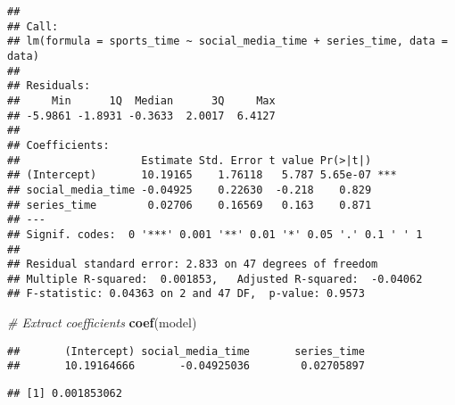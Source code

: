 \documentclass[
]{article}
\newenvironment{Shaded}{\begin{snugshade}}{\end{snugshade}}
\newcommand{\CommentTok}[1]{\textcolor[rgb]{0.56,0.35,0.01}{\textit{#1}}}
\newcommand{\FunctionTok}[1]{\textcolor[rgb]{0.13,0.29,0.53}{\textbf{#1}}}
\newcommand{\NormalTok}[1]{#1}
\newcommand{\OtherTok}[1]{\textcolor[rgb]{0.56,0.35,0.01}{#1}}
\newcommand{\SpecialCharTok}[1]{\textcolor[rgb]{0.81,0.36,0.00}{\textbf{#1}}}
\newcommand{\StringTok}[1]{\textcolor[rgb]{0.31,0.60,0.02}{#1}}
\begin{document}
\begin{verbatim}
## 
## Call:
## lm(formula = sports_time ~ social_media_time + series_time, data = data)
## 
## Residuals:
##     Min      1Q  Median      3Q     Max 
## -5.9861 -1.8931 -0.3633  2.0017  6.4127 
## 
## Coefficients:
##                   Estimate Std. Error t value Pr(>|t|)    
## (Intercept)       10.19165    1.76118   5.787 5.65e-07 ***
## social_media_time -0.04925    0.22630  -0.218    0.829    
## series_time        0.02706    0.16569   0.163    0.871    
## ---
## Signif. codes:  0 '***' 0.001 '**' 0.01 '*' 0.05 '.' 0.1 ' ' 1
## 
## Residual standard error: 2.833 on 47 degrees of freedom
## Multiple R-squared:  0.001853,   Adjusted R-squared:  -0.04062 
## F-statistic: 0.04363 on 2 and 47 DF,  p-value: 0.9573
\end{verbatim}

\begin{Shaded}
\begin{Highlighting}[]
\CommentTok{\# Extract coefficients}
\FunctionTok{coef}\NormalTok{(model)}
\end{Highlighting}
\end{Shaded}

\begin{verbatim}
##       (Intercept) social_media_time       series_time 
##       10.19164666       -0.04925036        0.02705897
\end{verbatim}

\begin{Shaded}
\end{Shaded}

\begin{verbatim}
## [1] 0.001853062
\end{verbatim}

\begin{Shaded}
\end{Shaded}
\end{document}
